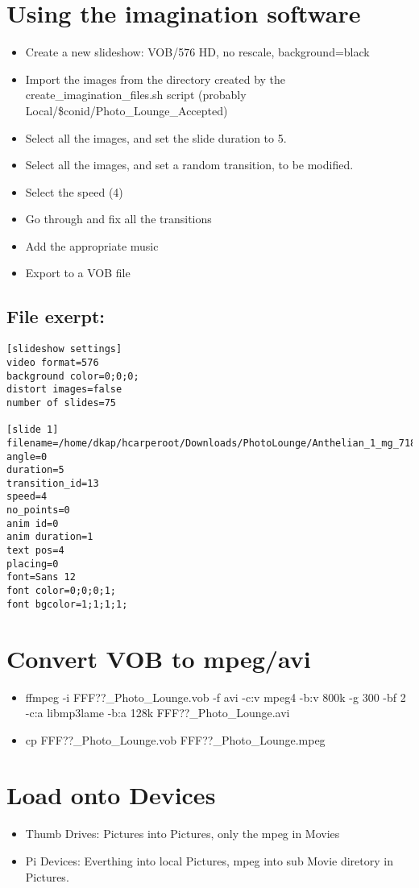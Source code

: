 \documentclass[captions=tablesignature]{scrartcl}
\begin{document}
\section{Using the imagination software}
\label{sec-6}
\begin{itemize}
\item Create a new slideshow: VOB/576 HD, no rescale, background=black
\item Import the images from the directory created by the
create\_imagination\_files.sh script (probably
Local/\$conid/Photo\_Lounge\_Accepted)
\item Select all the images, and set the slide duration to 5.
\item Select all the images, and set a random transition, to be
modified.
\item Select the speed (4)
\item Go through and fix all the transitions
\item Add the appropriate music
\item Export to a VOB file
\end{itemize}
\subsection{File exerpt:}
\label{sec-6-1}
\begin{verbatim}
[slideshow settings]
video format=576
background color=0;0;0;
distort images=false
number of slides=75

[slide 1]
filename=/home/dkap/hcarperoot/Downloads/PhotoLounge/Anthelian_1_mg_7182a.jpg
angle=0
duration=5
transition_id=13
speed=4
no_points=0
anim id=0
anim duration=1
text pos=4
placing=0
font=Sans 12
font color=0;0;0;1;
font bgcolor=1;1;1;1;
\end{verbatim}


\section{Convert VOB to mpeg/avi}
\label{sec-7}
\begin{itemize}
\item ffmpeg -i FFF??\_Photo\_Lounge.vob -f avi -c:v mpeg4 -b:v 800k -g 300 -bf 2 -c:a libmp3lame -b:a 128k FFF??\_Photo\_Lounge.avi
\item cp FFF??\_Photo\_Lounge.vob FFF??\_Photo\_Lounge.mpeg
\end{itemize}

\section{Load onto Devices}
\label{sec-8}
\begin{itemize}
\item Thumb Drives:  Pictures into Pictures, only the mpeg in Movies
\item Pi Devices: Everthing into local Pictures, mpeg into sub Movie diretory in Pictures.
\end{itemize}
\end{document}
